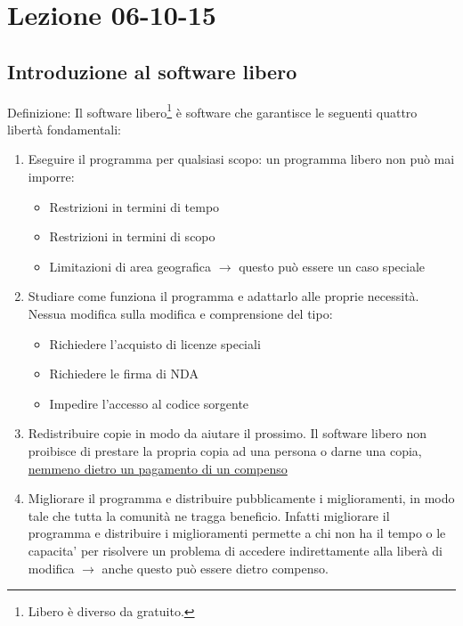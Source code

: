 \section{Lezione 06-10-15}

\subsection{Introduzione al software libero}

Definizione: Il software libero\footnote{Libero \`e diverso da gratuito.} \`e software che garantisce le seguenti quattro libert\`a fondamentali:

\begin{enumerate}

\item Eseguire il programma per qualsiasi scopo: un programma libero non pu\`o mai imporre:

  \begin{itemize}

  \item Restrizioni in termini di tempo
  \item Restrizioni in termini di scopo
  \item Limitazioni di area geografica $\to$ questo pu\`o essere un caso speciale
    
  \end{itemize}

\item Studiare come funziona il programma e adattarlo alle proprie necessit\`a. Nessua modifica sulla modifica e comprensione del tipo:

  \begin{itemize}

  \item Richiedere l'acquisto di licenze speciali
  \item Richiedere le firma di NDA
  \item Impedire l'accesso al codice sorgente
    
  \end{itemize}

\item Redistribuire copie in modo da aiutare il prossimo. Il software libero non proibisce di prestare la propria copia ad una persona o darne una copia, \underline{nemmeno dietro un pagamento di un compenso}

  \item Migliorare il programma e distribuire pubblicamente i miglioramenti, in modo tale che tutta la comunit\`a ne tragga beneficio. Infatti migliorare il programma e distribuire i miglioramenti permette a chi non ha il tempo o le capacita' per risolvere un problema di accedere indirettamente alla liber\`a di modifica $\to$ anche questo pu\`o essere dietro compenso.
  
\end{enumerate}

